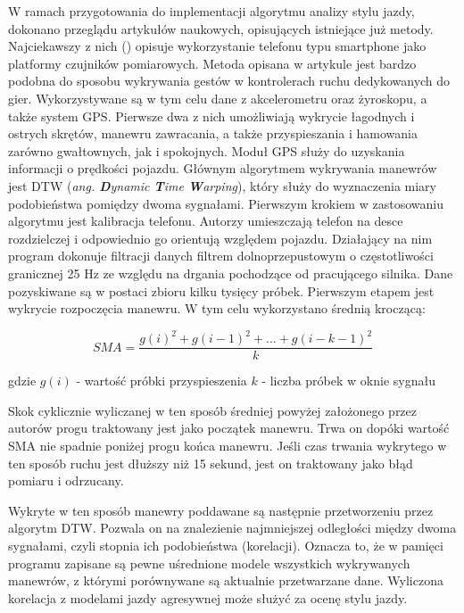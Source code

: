 W ramach przygotowania do implementacji algorytmu analizy stylu jazdy, dokonano przeglądu artykułów naukowych, opisujących istniejące już metody. Najciekawszy z nich (\cite{driving_analysis_article}) opisuje wykorzystanie telefonu typu smartphone jako platformy czujników pomiarowych. Metoda opisana w artykule jest bardzo podobna do sposobu wykrywania gestów w kontrolerach ruchu dedykowanych do gier.  Wykorzystywane są w tym celu dane z akcelerometru oraz żyroskopu, a także system GPS. Pierwsze dwa z nich umożliwiają wykrycie łagodnych i ostrych skrętów, manewru zawracania, a także przyspieszania i hamowania zarówno gwałtownych, jak i spokojnych. Moduł GPS służy do uzyskania informacji o prędkości pojazdu. Głównym algorytmem wykrywania manewrów jest DTW (\textit{ang. \textbf{D}ynamic \textbf{T}ime \textbf{W}arping}), który służy do wyznaczenia miary podobieństwa pomiędzy dwoma sygnałami. 
Pierwszym krokiem w zastosowaniu algorytmu jest kalibracja telefonu. Autorzy umieszczają telefon na desce rozdzielczej i odpowiednio go orientują względem pojazdu. Działający na nim program dokonuje filtracji danych filtrem dolnoprzepustowym o częstotliwości granicznej 25 Hz ze względu na drgania pochodzące od pracującego silnika. Dane pozyskiwane są w postaci zbioru kilku tysięcy próbek. 
Pierwszym etapem jest wykrycie rozpoczęcia manewru. W tym celu wykorzystano średnią kroczącą:

\begin{equation}
	SMA = \frac{g(i)^2 + g(i-1)^2 + ... + g(i-k-1)^2}{k}
\end{equation}

gdzie
$g(i)$ - wartość próbki przyspieszenia
$k$ - liczba próbek w oknie sygnału

Skok cyklicznie wyliczanej w ten sposób średniej powyżej założonego przez autorów progu traktowany jest jako początek manewru. Trwa on dopóki wartość SMA nie spadnie poniżej progu końca manewru. Jeśli czas trwania wykrytego w ten sposób ruchu jest dłuższy niż 15 sekund, jest on traktowany jako błąd pomiaru i odrzucany.

Wykryte w ten sposób manewry poddawane są następnie przetworzeniu przez algorytm DTW. Pozwala on na znalezienie najmniejszej odległości między dwoma sygnałami, czyli stopnia ich podobieństwa (korelacji). Oznacza to, że w pamięci programu zapisane są pewne uśrednione modele wszystkich wykrywanych manewrów, z którymi porównywane są aktualnie przetwarzane dane. Wyliczona korelacja z modelami jazdy agresywnej może służyć za ocenę stylu jazdy.


